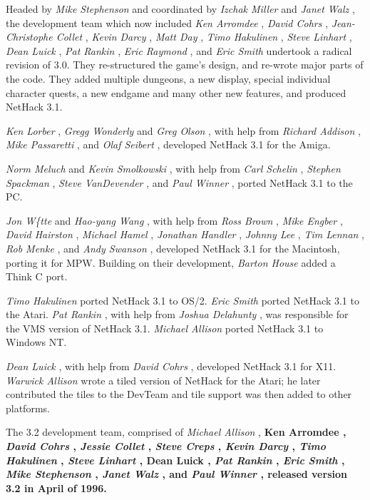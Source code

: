 Headed by %
{\it Mike Stephenson}%
and coordinated by %
{\it Izchak Miller}%
and
%
{\it Janet Walz}%
, the development team which now included %
{\it Ken Arromdee}%
,
%
{\it David Cohrs}%
, %
{\it Jean-Christophe Collet}%
, %
{\it Kevin Darcy}%
,
%
{\it Matt Day}%
, %
{\it Timo Hakulinen}%
, %
{\it Steve Linhart}%
, %
{\it Dean Luick}%
,
%
{\it Pat Rankin}%
, %
{\it Eric Raymond}%
, and %
{\it Eric Smith}%
undertook a radical
revision of 3.0.  They re-structured the game's design, and re-wrote major
parts of the code.  They added multiple dungeons, a new display, special
individual character quests, a new endgame and many other new features, and
produced NetHack 3.1.

%
{\it Ken Lorber}%
, %
{\it Gregg Wonderly}%
and %
{\it Greg Olson}%
, with help
from %
{\it Richard Addison}%
, %
{\it Mike Passaretti}%
, and %
{\it Olaf Seibert}%
,
developed NetHack 3.1 for the Amiga.

%
{\it Norm Meluch}%
and %
{\it Kevin Smolkowski}%
, with help from
%
{\it Carl Schelin}%
, %
{\it Stephen Spackman}%
, %
{\it Steve VanDevender}%
,
and %
{\it Paul Winner}%
, ported NetHack 3.1 to the PC.

%
{\it Jon W\{tte}%
and %
{\it Hao-yang Wang}%
, with help from %
{\it Ross Brown}%
,
%
{\it Mike Engber}%
, %
{\it David Hairston}%
, %
{\it Michael Hamel}%
,
%
{\it Jonathan Handler}%
, %
{\it Johnny Lee}%
, %
{\it Tim Lennan}%
, %
{\it Rob Menke}%
,
and %
{\it Andy Swanson}%
, developed NetHack 3.1 for the Macintosh,
porting it for MPW.  Building on their development, %
{\it Barton House}%
added a Think C port.

%
{\it Timo Hakulinen}%
ported NetHack 3.1 to OS/2.  %
{\it Eric Smith}%
ported NetHack 3.1 to the Atari.  %
{\it Pat Rankin}%
, with help from
%
{\it Joshua Delahunty}%
, was responsible for the VMS version of NetHack 3.1.
%
{\it Michael Allison}%
ported NetHack 3.1 to Windows NT.

%
{\it Dean Luick}%
, with help from %
{\it David Cohrs}%
, developed NetHack
3.1 for X11.
%
{\it Warwick Allison}%
wrote a tiled version of NetHack for the Atari;
he later contributed the tiles to the DevTeam and tile support was
then added to other platforms.

The 3.2 development team, comprised of %
{\it Michael Allison}%
, %
\bf Ken
Arromdee\rm%
, %
{\it David Cohrs}%
, %
{\it Jessie Collet}%
, %
{\it Steve Creps}%
,
%
{\it Kevin Darcy}%
, %
{\it Timo Hakulinen}%
, %
{\it Steve Linhart}%
, %
\bf Dean
Luick\rm%
, %
{\it Pat Rankin}%
, %
{\it Eric Smith}%
, %
{\it Mike Stephenson}%
,
%
{\it Janet Walz}%
, and %
{\it Paul Winner}%
, released version 3.2 in April of
1996.

